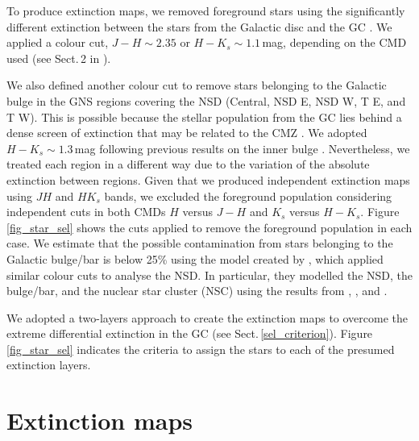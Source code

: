 \documentclass{aa}
\begin{document}
To produce extinction maps, we removed foreground stars using the significantly different extinction between the stars from the Galactic disc and the GC \citep[e.g.][]{Nogueras-Lara:2019aa}. We applied a colour cut, $J-H\sim2.35$ or $H-K_s\sim1.1$\,mag, depending on the CMD used (see Sect.\,2 in \citealt{Nogueras-Lara:2021uz}). 

We also defined another colour cut to remove stars belonging to the Galactic bulge in the GNS regions covering the NSD (Central, NSD E, NSD W, T E, and T W). This is possible because the stellar population from the GC lies behind a dense screen of extinction that may be related to the CMZ \citep[e.g.][]{Schultheis:2009tg}. We adopted $H-K_s\sim1.3$\,mag following previous results on the inner bulge \citep[e.g.][]{Nogueras-Lara:2018ab, Nogueras-Lara:2019ad,Schultheis:2021wf}. Nevertheless, we treated each region in a different way due to the variation of the absolute extinction between regions. Given that we produced independent extinction maps using $JH$ and $HK_s$ bands, we excluded the foreground population considering independent cuts in both CMDs $H$ versus $J-H$ and $K_s$ versus $H-K_s$. Figure\,\ref{fig_star_sel} shows the cuts applied to remove the foreground population in each case. We estimate that the possible contamination from stars belonging to the Galactic bulge/bar is below 25\% using the model created by  \citet{Schultheis:2021wf}, which applied similar colour cuts to analyse the NSD. In particular, they modelled the NSD, the bulge/bar, and the nuclear star cluster (NSC) using the results from \citet{Launhardt:2002nx}, \citet{Chatzopoulos:2015yu}, and \citet{Sormani:2020aa}.





We adopted a two-layers approach to create the extinction maps to overcome the extreme differential extinction in the GC (see Sect.\,\ref{sel_criterion}). Figure\,\ref{fig_star_sel} indicates the criteria to assign the stars to each of the presumed extinction layers.  



\section{Extinction maps}
\end{document}
